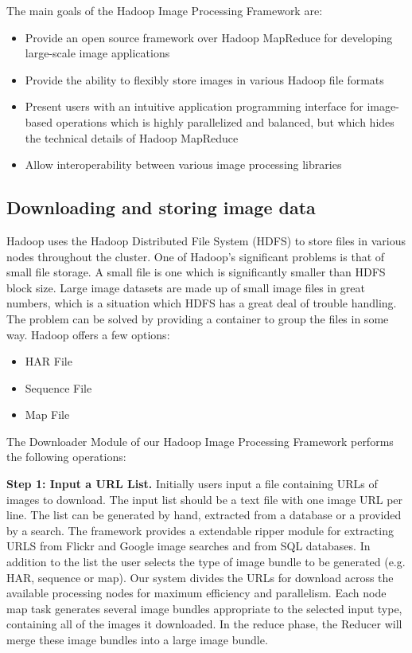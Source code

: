 \documentclass[conference]{IEEEtran}
\begin{document}
The main goals of the Hadoop Image Processing Framework are:
\begin{itemize}
\item Provide an open source framework over Hadoop MapReduce for
  developing large-scale image applications
\item Provide the ability to flexibly store images in various Hadoop
  file formats
\item Present users with an intuitive application programming
  interface for image-based operations which is highly parallelized
  and balanced, but which hides the technical details of Hadoop
  MapReduce
\item Allow interoperability between various image processing
  libraries
\end{itemize}

\subsection{Downloading and storing image data}
Hadoop uses the Hadoop Distributed File System (HDFS) to store files
in various nodes throughout the cluster.  One of Hadoop's significant
problems is that of small file storage. \cite{White2009} A small file
is one which is significantly smaller than HDFS block size.  Large
image datasets are made up of small image files in great numbers,
which is a situation which HDFS has a great deal of trouble
handling. The problem can be solved by providing a container to group
the files in some way. Hadoop offers a few options:
\begin{itemize}
	\item HAR File
	\item Sequence File
	\item Map File
\end{itemize}

The Downloader Module of our Hadoop Image Processing Framework
performs the following operations:

\textbf{Step 1: Input a URL List.} Initially users input a file
containing URLs of images to download. The input list should be a text
file with one image URL per line. The list can be generated by hand,
extracted from a database or a provided by a search. The framework
provides a extendable ripper module for extracting URLS from Flickr
and Google image searches and from SQL databases. In addition to the
list the user selects the type of image bundle to be generated
(e.g. HAR, sequence or map).  Our system divides the URLs for download
across the available processing nodes for maximum efficiency and
parallelism.  Each node map task generates several image bundles
appropriate to the selected input type, containing all of the images
it downloaded. In the reduce phase, the Reducer will merge these image
bundles into a large image bundle.
\end{document}
